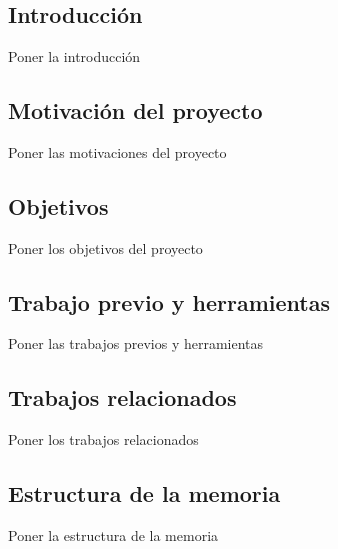 \chapter{}
\thispagestyle{empty}

\section*{Introducción}
\thispagestyle{empty}

       \vspace{1cm}


Poner la introducción

\section{Motivación del proyecto}
\thispagestyle{empty}

       \vspace{1cm}

Poner las motivaciones del proyecto

\section{Objetivos}
\thispagestyle{empty}

       \vspace{1cm}

Poner los objetivos del proyecto

\section{Trabajo previo y herramientas}
\thispagestyle{empty}

       \vspace{1cm}

Poner las trabajos previos y herramientas       

\section{Trabajos relacionados}
\thispagestyle{empty}

       \vspace{1cm}

Poner los trabajos relacionados


\section{Estructura de la memoria}
\thispagestyle{empty}
       \vspace{1cm}

Poner la estructura de la memoria



